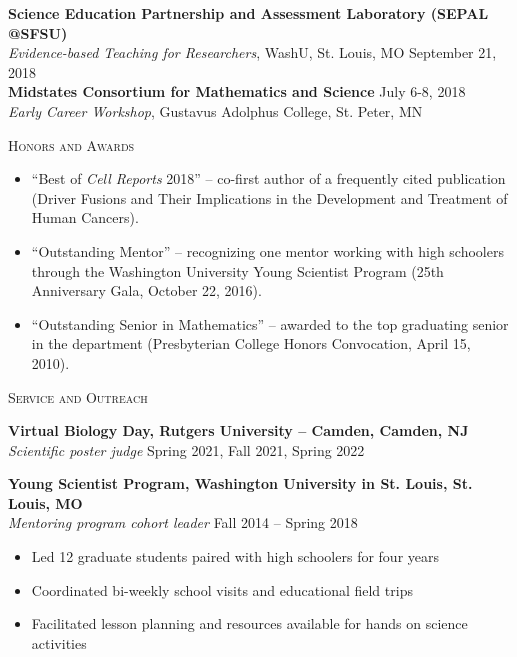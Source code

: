 \documentclass[11pt]{article}
\begin{document}
\textbf{Science Education Partnership and Assessment Laboratory (SEPAL @SFSU)} \\
\emph{Evidence-based Teaching for Researchers}, WashU, St. Louis, MO \hfill September 21, 2018 \\

\textbf{Midstates Consortium for Mathematics and Science} \hfill July 6-8, 2018 \\
\emph{Early Career Workshop}, Gustavus Adolphus College,  St. Peter, MN \\

\hrulefill

\bigskip

\textsc{\Large Honors and Awards}

\begin{itemize}
	\item ``Best of \emph{Cell Reports} 2018'' -- co-first author of a frequently cited publication (Driver Fusions and Their Implications in the Development and Treatment of Human Cancers).
	\item ``Outstanding Mentor'' -- recognizing one mentor working with high schoolers through the Washington University Young Scientist Program (25th Anniversary Gala, October 22, 2016).
	\item ``Outstanding Senior in Mathematics'' -- awarded to the top graduating senior in the department (Presbyterian College Honors Convocation, April 15, 2010).
\end{itemize}

\hrulefill

\bigskip

\textsc{\Large Service and Outreach}

\bigskip

\textbf{Virtual Biology Day, Rutgers University -- Camden, Camden, NJ } \\
\emph{Scientific poster judge} \hfill Spring 2021, Fall 2021, Spring 2022

\bigskip

\textbf{Young Scientist Program, Washington University in St. Louis, St. Louis, MO} \\
\emph{Mentoring program cohort leader} \hfill Fall 2014 -- Spring 2018
\begin{itemize}
	\item Led 12 graduate students paired with high schoolers for four years
	\item Coordinated bi-weekly school visits and educational field trips
	\item Facilitated lesson planning and resources available for hands on science activities
\end{itemize}
\end{document}
